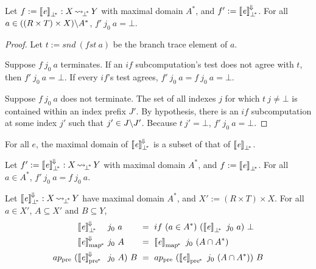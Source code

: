 \begin{theorem}
Let $f := \left\llbracket{\mathit{e}}\right\rrbracket_{\bot^{\mspace{-4mu}*}} : X \operatorname{\rightsquigarrow_{\mspace{-3mu}{\bot^{\mspace{-4mu}*}}}} Y$ with maximal domain $A^*$, and $f' := \left\llbracket{\mathit{e}}\right\rrbracket^{\mspace{-2mu}\Downarrow\mspace{-2mu}}_{\bot^{\mspace{-4mu}*}}$.
For all $a \in ((R \times T) \times X) \backslash A^*$, $f'~j_0~a = \bot$.
\end{theorem}
\begin{proof}
Let $t := snd~(fst~a)$ be the branch trace element of $a$.

Suppose $f~j_0~a$ terminates.
If an $if$ subcomputation's test does not agree with $t$, then $f'~j_0~a = \bot$.
If every $if$'s test agrees, $f'~j_0~a = f~j_0~a = \bot$.

Suppose $f~j_0~a$ does not terminate.
The set of all indexes $j$ for which $t~j \neq \bot$ is contained within an index prefix $J'$.
By hypothesis, there is an $if$ subcomputation at some index $j'$ such that $j' \in J \backslash J'$.
Because $t~j' = \bot$, $f'~j_0~a = \bot$.
\end{proof}

\begin{corollary}
For all $\mathit{e}$, the maximal domain of $\left\llbracket{\mathit{e}}\right\rrbracket^{\mspace{-2mu}\Downarrow\mspace{-2mu}}_{\bot^{\mspace{-4mu}*}}$ is a subset of that of $\left\llbracket{\mathit{e}}\right\rrbracket_{\bot^{\mspace{-4mu}*}}$.
\end{corollary}

\begin{corollary}
Let $f' := \left\llbracket{\mathit{e}}\right\rrbracket^{\mspace{-2mu}\Downarrow\mspace{-2mu}}_{\bot^{\mspace{-4mu}*}} : X \operatorname{\rightsquigarrow_{\mspace{-3mu}{\bot^{\mspace{-4mu}*}}}} Y$ with maximal domain $A^*$, and $f := \left\llbracket{\mathit{e}}\right\rrbracket_{\bot^{\mspace{-4mu}*}}$.
For all $a \in A^*$, $f'~j_0~a = f~j_0~a$.
\end{corollary}


\begin{corollary}
\label{cor:correct-convergence}
Let $\left\llbracket{\mathit{e}}\right\rrbracket^{\mspace{-2mu}\Downarrow\mspace{-2mu}}_{\bot^{\mspace{-4mu}*}} : X \operatorname{\rightsquigarrow_{\mspace{-3mu}{\bot^{\mspace{-4mu}*}}}} Y$ have maximal domain $A^*$, and $X' := (R \times T) \times X$.
For all $a \in X'$, $A \subseteq X'$ and $B \subseteq Y$,
\begin{equation}
\begin{aligned}
	&\meaningofconv{\mathit{e}}_\pbot &&\!\!\!\!j_0~a &&\!\!\!\!= \ if~(a \in A^*)~(\meaningof{\mathit{e}}_\pbot~j_0~a)~\bot \\
	&\meaningofconv{\mathit{e}}\pmap &&\!\!\!\!j_0~A &&\!\!\!\!= \ \meaningof{\mathit{e}}\pmap~j_0~(A \i A^*) \\
	ap\pre~(\!&\meaningofconv{\mathit{e}}\ppre &&\!\!\!\!j_0~A)~B &&\!\!\!\!= \ ap\pre~(\meaningof{\mathit{e}}\ppre~j_0~(A \i A^*))~B
\end{aligned}
\end{equation}
\end{corollary}

